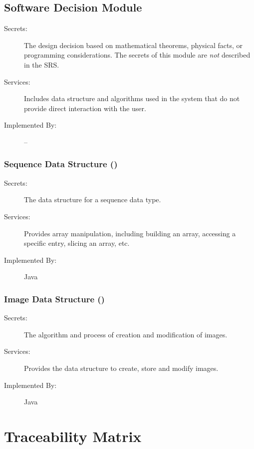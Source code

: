 \documentclass[12pt, titlepage]{article}
\begin{document}
\subsection{Software Decision Module}

\begin{description}
\item[Secrets:] The design decision based on mathematical theorems, physical
  facts, or programming considerations. The secrets of this module are
  \emph{not} described in the SRS.
\item[Services:] Includes data structure and algorithms used in the system that
  do not provide direct interaction with the user. 
\item[Implemented By:] --
\end{description}

\subsubsection{Sequence Data Structure ()}

\begin{description}
\item[Secrets:]The data structure for a sequence data type.
\item[Services:]Provides array manipulation, including building an array,
accessing a specific entry, slicing an array, etc.
\item[Implemented By:] Java
\end{description}

\subsubsection{Image Data Structure ()}

\begin{description}
\item[Secrets:]The algorithm and process of creation and modification of
images.\item[Services:]Provides the data structure to create, store and modify
images.
\item[Implemented By:] Java
\end{description}

\section{Traceability Matrix} \label{SecTM}
\end{document}
